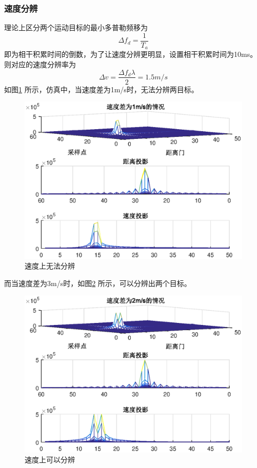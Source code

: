 \documentclass[12pt]{article}
\begin{document}
\subsubsection{速度分辨}
理论上区分两个运动目标的最小多普勒频移为
\begin{equation}\label{julifenbianlv21}
  \Delta f_d=\frac{1}{T_a}
\end{equation}
即为相干积累时间的倒数，为了让速度分辨更明显，设置相干积累时间为10ms。则对应的速度分辨率为
\begin{equation}\label{sudufenblv2}
  \Delta v=\frac{\Delta f_d\lambda}{2}=1.5m/s
\end{equation}
如图\ref{sudufenbianlv1}
所示，仿真中，当速度差为1m/s时，无法分辨两目标。
\begin{figure}[htbp]
  \centering
  \includegraphics[width=\textwidth]{sudufenbianlv1}
  \caption{速度上无法分辨}\label{sudufenbianlv1}
\end{figure}\par
而当速度差为3m/s时，如图\ref{sudufenbianlv2}
所示，可以分辨出两个目标。
\begin{figure}[htbp]
  \centering
  \includegraphics[width=\textwidth]{sudufenbianlv2}
  \caption{速度上可以分辨}\label{sudufenbianlv2}
\end{figure}
\newpage
\end{document}
